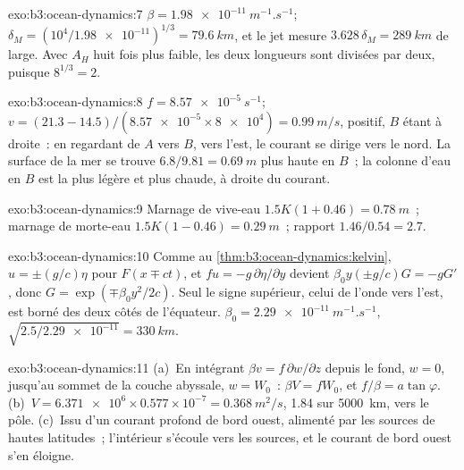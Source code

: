 \begin{solution}{exo:b3:ocean-dynamics:7}
$\beta = \qty{1.98e-11}{m^{-1}.s^{-1}}$; $\delta_M = (10^4/\num{1.98e-11})^{1/3}
= \qty{79.6}{km}$, et le jet mesure $3.628\,\delta_M = \qty{289}{km}$ de large.
Avec $A_H$ huit fois plus faible, les deux longueurs sont divisées par deux, puisque $8^{1/3} = 2$.
\end{solution}

\begin{solution}{exo:b3:ocean-dynamics:8}
$f = \qty{8.57e-5}{s^{-1}}$; $v = (21.3 - 14.5)/(\num{8.57e-5}\times\num{8e4})
= \qty{0.99}{m/s}$, positif, $B$ étant à droite~: en regardant de $A$ vers $B$,
vers l'est, le courant se dirige vers le nord. La surface de la mer se trouve
$6.8/9.81 = \qty{0.69}{m}$ plus haute en $B$~; la colonne d'eau en $B$ est la
plus légère et plus chaude, à droite du courant.
\end{solution}

\begin{solution}{exo:b3:ocean-dynamics:9}
Marnage de vive-eau $1.5K(1 + 0.46) = \qty{0.78}{m}$~; marnage de morte-eau $1.5K(1 - 0.46)
= \qty{0.29}{m}$~; rapport $1.46/0.54 = 2.7$.
\end{solution}

\begin{solution}{exo:b3:ocean-dynamics:10}
Comme au \cref{thm:b3:ocean-dynamics:kelvin}, $u = \pm(g/c)\eta$ pour $F(x \mp
ct)$, et $fu = -g\,\partial\eta/\partial y$ devient $\beta_0y(\pm g/c)G =
-gG'$, donc $G = \exp(\mp\beta_0y^2/2c)$. Seul le signe supérieur, celui de l'onde
vers l'est, est borné des deux côtés de l'équateur. $\beta_0 =
\qty{2.29e-11}{m^{-1}.s^{-1}}$, $\sqrt{2.5/\num{2.29e-11}} = \qty{330}{km}$.
\end{solution}

\begin{solution}{exo:b3:ocean-dynamics:11}
(a)~En intégrant $\beta v = f\,\partial w/\partial z$ depuis le fond, $w = 0$,
jusqu'au sommet de la couche abyssale, $w = W_0$~: $\beta V = fW_0$, et $f/\beta =
a\tan\varphi$. (b)~$V = \num{6.371e6}\times0.577\times10^{-7} =
\qty{0.368}{m^2/s}$, \qty{1.84}{\sverdrup} sur \qty{5000}{km}, vers le pôle.
(c)~Issu d'un courant profond de bord ouest, alimenté par les sources de hautes latitudes~;
l'intérieur s'écoule vers les sources, et le courant de bord ouest s'en
éloigne.
\end{solution}

